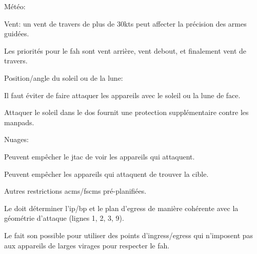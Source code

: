 \begin{e1}
\begin{e2}
\begin{e3}
		\end{e3}
		
		\item Météo:
		
		\begin{e3}
			
			\item Vent: un vent de travers de plus de 30kts peut affecter la précision des armes guidées.
			
			Les priorités pour le \gls{fah} sont vent arrière, vent debout, et finalement vent de travers.
			
			\item Position/angle du soleil ou de la lune:
			
			\begin{e4}
				
				\item Il faut éviter de faire attaquer les appareils avec le soleil ou la lune de face.
				
				\item Attaquer le soleil dans le dos fournit une protection supplémentaire contre les \glspl{manpad}.
				
			\end{e4}
			
			\item Nuages:
			
			\begin{e4}
				
				\item Peuvent empêcher le \gls{jtac} de voir les appareils qui attaquent.
				
				\item Peuvent empêcher les appareils qui attaquent de trouver la cible.
				
			\end{e4}
			
		\end{e3}
		
		\item Autres restrictions \glspl{acm}/\glspl{fscm} pré-planifiées.
		
		\item Le \ja{} doit déterminer l'\gls{ip}/\gls{bp} et le plan d'egress de manière cohérente avec la géométrie d'attaque (lignes 1, 2, 3, 9).
		
		Le \ja{} fait son possible pour utiliser des points d'ingress/egress qui n'imposent pas aux appareils de larges virages pour respecter le \gls{fah}.
		
	\end{e2}
	

\end{e1}
